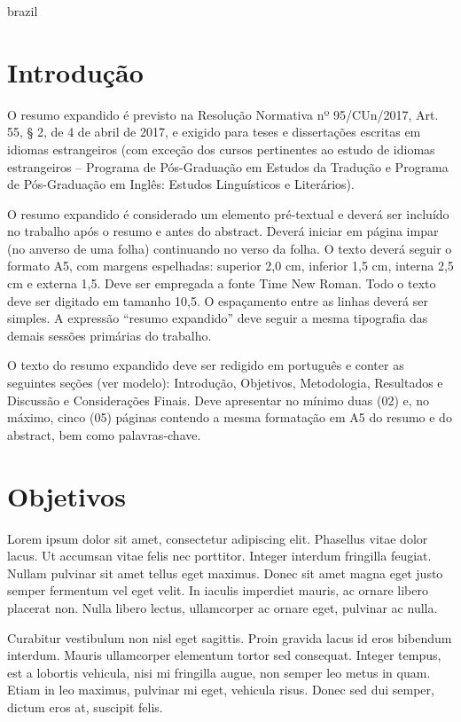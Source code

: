     \begin{otherlanguage*}{brazil}
        \setlength{\parskip}{0.2cm}
        \setlength{\parindent}{0.0cm}

        \section*{Introdução}
        O resumo expandido é previsto na Resolução Normativa nº 95/CUn/2017, Art. 55, § 2, de 4 de
        abril de 2017, e exigido para teses e dissertações escritas em idiomas estrangeiros (com
        exceção dos cursos pertinentes ao estudo de idiomas estrangeiros – Programa de Pós-Graduação
        em Estudos da Tradução e Programa de Pós-Graduação em Inglês: Estudos Linguísticos e
        Literários).

        O resumo expandido é considerado um elemento pré-textual e deverá ser incluído no trabalho
        após o resumo e antes do abstract. Deverá iniciar em página impar (no anverso de uma folha)
        continuando no verso da folha. O texto deverá seguir o formato A5, com margens espelhadas:
        superior 2,0 cm, inferior 1,5 cm, interna 2,5 cm e externa 1,5. Deve ser empregada a fonte
        Time New Roman.  Todo o texto deve ser digitado em tamanho 10,5. O espaçamento entre as
        linhas deverá ser simples. A expressão “resumo expandido” deve seguir a mesma tipografia das
        demais sessões primárias do trabalho.

        O texto do resumo expandido deve ser redigido em português e conter as seguintes seções (ver
        modelo): Introdução, Objetivos, Metodologia, Resultados e Discussão e Considerações Finais.
        Deve apresentar no mínimo duas (02) e, no máximo, cinco (05) páginas contendo a mesma
        formatação em A5 do resumo e do abstract, bem como palavras-chave.

        \section*{Objetivos}
        Lorem ipsum dolor sit amet, consectetur adipiscing elit. Phasellus vitae dolor lacus. Ut
        accumsan vitae felis nec porttitor. Integer interdum fringilla feugiat. Nullam pulvinar sit
        amet tellus eget maximus. Donec sit amet magna eget justo semper fermentum vel eget velit.
        In iaculis imperdiet mauris, ac ornare libero placerat non. Nulla libero lectus, ullamcorper
        ac ornare eget, pulvinar ac nulla.

        Curabitur vestibulum non nisl eget sagittis. Proin
        gravida lacus id eros bibendum interdum. Mauris ullamcorper elementum tortor sed consequat.
        Integer tempus, est a lobortis vehicula, nisi mi fringilla augue, non semper leo metus in
        quam. Etiam in leo maximus, pulvinar mi eget, vehicula risus. Donec sed dui semper, dictum
        eros at, suscipit felis.


\end{otherlanguage*}
